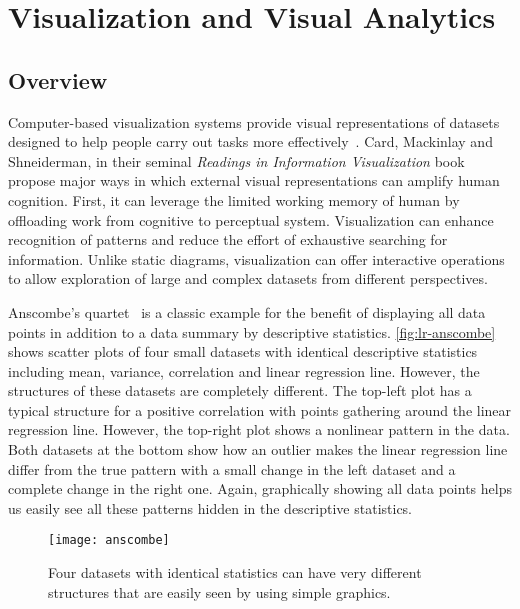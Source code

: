 \section{Visualization and Visual Analytics}

\subsection{Overview}
Computer-based visualization systems provide visual representations of datasets designed to help people carry out tasks more effectively~\cite{Munzner2014}. Card, Mackinlay and Shneiderman, in their seminal \emph{Readings in Information Visualization} book~\cite{Card1999} propose major ways in which external visual representations can amplify human cognition. First, it can leverage the limited working memory of human by offloading work from cognitive to perceptual system. Visualization can enhance recognition of patterns and reduce the effort of exhaustive searching for information. Unlike static diagrams, visualization can offer interactive operations to allow exploration of large and complex datasets from different perspectives.

Anscombe's quartet~\cite{Anscombe1973} is a classic example for the benefit of displaying all data points in addition to a data summary by descriptive statistics. \autoref{fig:lr-anscombe} shows scatter plots of four small datasets with identical descriptive statistics including mean, variance, correlation and linear regression line. However, the structures of these datasets are completely different. The top-left plot has a typical structure for a positive correlation with points gathering around the linear regression line. However, the top-right plot shows a nonlinear pattern in the data. Both datasets at the bottom show how an outlier makes the linear regression line differ from the true pattern with a small change in the left dataset and a complete change in the right one. Again, graphically showing all data points helps us easily see all these patterns hidden in the descriptive statistics.

\begin{figure}[!htb]
	\centering
	\texttt{[image: anscombe]}
	\caption[An example showing benefit of visualization]{Four datasets with identical statistics can have very different structures that are easily seen by using simple graphics. }
	\label{fig:lr-anscombe}
\end{figure}

